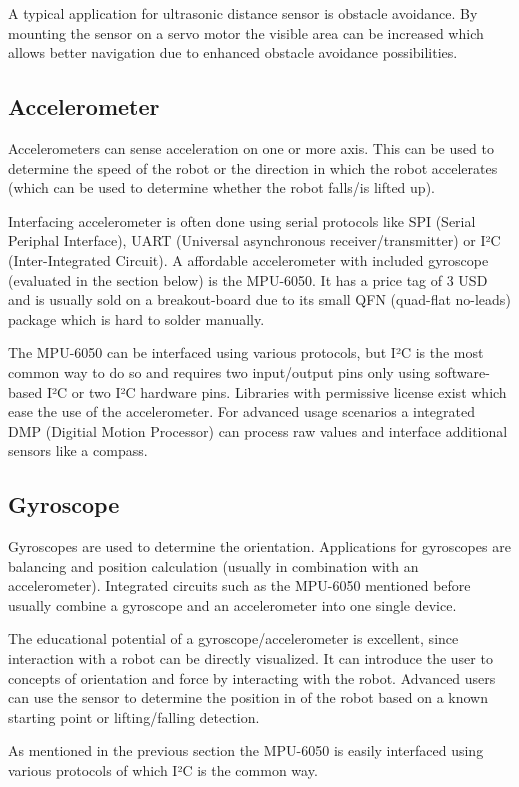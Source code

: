 \documentclass[11pt,a4paper]{article}
\begin{document}
A typical application for ultrasonic distance sensor is obstacle avoidance. By mounting the sensor on a servo motor the visible area can be increased which allows better navigation due to enhanced obstacle avoidance possibilities. 

\subsection{Accelerometer}
Accelerometers can sense acceleration on one or more axis. This can be used to determine the speed of the robot or the direction in which the robot accelerates (which can be used to determine whether the robot falls/is lifted up). 

Interfacing accelerometer is often done using serial protocols like SPI (Serial Periphal Interface), UART (Universal asynchronous receiver/transmitter) or I²C (Inter-Integrated Circuit). A affordable accelerometer with included gyroscope (evaluated in the section below) is the MPU-6050. It has a price tag of 3 USD and is usually sold on a breakout-board due to its small QFN (quad-flat no-leads) package which is hard to solder manually. 

The MPU-6050 can be interfaced using various protocols, but I²C is the most common way to do so and requires two input/output pins only using software-based I²C or two I²C hardware pins. Libraries with permissive license exist which ease the use of the accelerometer. For advanced usage scenarios a integrated DMP (Digitial Motion Processor) can process raw values and interface additional sensors like a compass.
\subsection{Gyroscope}
Gyroscopes are used to determine the orientation. Applications for gyroscopes are balancing and position calculation (usually in combination with an accelerometer). Integrated circuits such as the MPU-6050 mentioned before usually combine a gyroscope and an accelerometer into one single device.

The educational potential of a gyroscope/accelerometer is excellent, since interaction with a robot can be directly visualized. It can introduce the user to concepts of orientation and force by interacting with the robot. Advanced users can use the sensor to determine the position in of the robot based on a known starting point or lifting/falling detection.

As mentioned in the previous section the MPU-6050 is easily interfaced using various protocols of which I²C is the common way.
\end{document}
